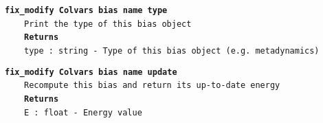 \begin{mdexampleinput}{}
\texttt{\textbf{fix\_modify Colvars bias name type}}
\\
\-~~~~\texttt{Print the type of this bias object}
\\
\-~~~~\texttt{\textbf{Returns}}
\\
\-~~~~\texttt{type : string - Type of this bias object (e.g. metadynamics)}
\end{mdexampleinput}
\begin{mdexampleinput}{}
\texttt{\textbf{fix\_modify Colvars bias name update}}
\\
\-~~~~\texttt{Recompute this bias and return its up-to-date energy}
\\
\-~~~~\texttt{\textbf{Returns}}
\\
\-~~~~\texttt{E : float - Energy value}
\end{mdexampleinput}
